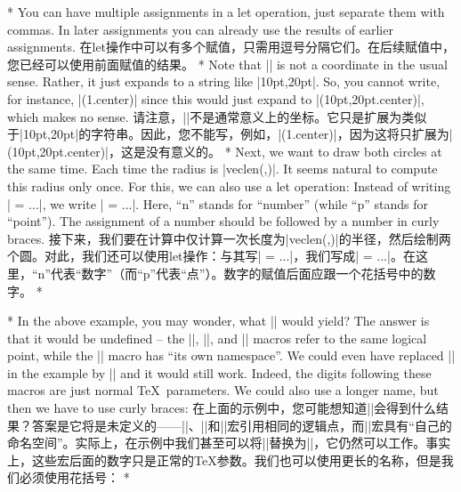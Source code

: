 \begin{paracol}{2}
\switchcolumn[0]*%
You can have multiple assignments in a let operation, just separate them with
commas. In later assignments you can already use the results of earlier
assignments.
\switchcolumn
在let操作中可以有多个赋值，只需用逗号分隔它们。在后续赋值中，您已经可以使用前面赋值的结果。
\switchcolumn[0]*%
Note that || is not a coordinate in the usual sense. Rather, it just expands
to a string like |10pt,20pt|. So, you cannot write, for instance,
|(\p1.center)| since this would just expand to |(10pt,20pt.center)|, which
makes no sense.
\switchcolumn
请注意，||不是通常意义上的坐标。它只是扩展为类似于|10pt,20pt|的字符串。因此，您不能写，例如，|(\p1.center)|，因为这将只扩展为|(10pt,20pt.center)|，这是没有意义的。
\switchcolumn[0]*%
Next, we want to draw both circles at the same time. Each time the radius is
|veclen(,)|. It seems natural to compute this radius only once. For this,
we can also use a let operation: Instead of writing | = ...|, we write
| = ...|. Here, ``n'' stands for ``number'' (while ``p'' stands for
``point''). The assignment of a number should be followed by a number in curly
braces.
\switchcolumn
接下来，我们要在计算中仅计算一次长度为|veclen(,)|的半径，然后绘制两个圆。对此，我们还可以使用let操作：与其写| = ...|，我们写成| = ...|。在这里，“n”代表“数字”（而“p”代表“点”）。数字的赋值后面应跟一个花括号中的数字。
\switchcolumn[1]*%
\begin{codeexample}[preamble={\usetikzlibrary{calc}}]
\end{codeexample}
\switchcolumn[0]*%
In the above example, you may wonder, what || would yield? The answer is
that it would be undefined -- the |\p|, |\x|, and |\y| macros refer to the same
logical point, while the |\n| macro has ``its own namespace''. We could even
have replaced || in the example by || and it would still work. Indeed,
the digits following these macros are just normal \TeX\ parameters. We could
also use a longer name, but then we have to use curly braces:
\switchcolumn
在上面的示例中，您可能想知道||会得到什么结果？答案是它将是未定义的——|\p|、|\x|和|\y|宏引用相同的逻辑点，而|\n|宏具有“自己的命名空间”。实际上，在示例中我们甚至可以将||替换为||，它仍然可以工作。事实上，这些宏后面的数字只是正常的\TeX 参数。我们也可以使用更长的名称，但是我们必须使用花括号：
\switchcolumn[1]*%
\begin{codeexample}[preamble={\usetikzlibrary{calc}}]
\end{codeexample}
\end{paracol}
